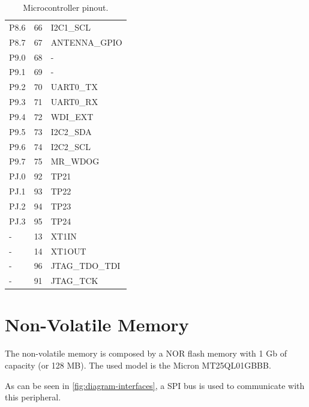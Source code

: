 \begin{table}[!h]
\begin{tabular}{lcl}
        P8.6              & 66                  & I2C1\_SCL             \\
        P8.7              & 67                  & ANTENNA\_GPIO         \\
        \midrule
        P9.0              & 68                  & -                     \\
        P9.1              & 69                  & -                     \\
        P9.2              & 70                  & UART0\_TX             \\
        P9.3              & 71                  & UART0\_RX             \\
        P9.4              & 72                  & WDI\_EXT              \\
        P9.5              & 73                  & I2C2\_SDA             \\
        P9.6              & 74                  & I2C2\_SCL             \\
        P9.7              & 75                  & MR\_WDOG              \\
        \midrule
        PJ.0              & 92                  & TP21                  \\
        PJ.1              & 93                  & TP22                  \\
        PJ.2              & 94                  & TP23                  \\
        PJ.3              & 95                  & TP24                  \\
        \midrule
        -                 & 13                  & XT1IN                 \\
        -                 & 14                  & XT1OUT                \\
        -                 & 96                  & JTAG\_TDO\_TDI        \\
        -                 & 91                  & JTAG\_TCK             \\
        \bottomrule[1.5pt]
    \end{tabular}
    \caption{Microcontroller pinout.}
    \label{tab:mcu-pinout}
\end{table}

\section{Non-Volatile Memory}

The non-volatile memory is composed by a NOR flash memory with 1 Gb of capacity (or 128 MB). The used model is the Micron MT25QL01GBBB.

As can be seen in \autoref{fig:diagram-interfaces}, a SPI bus is used to communicate with this peripheral.

